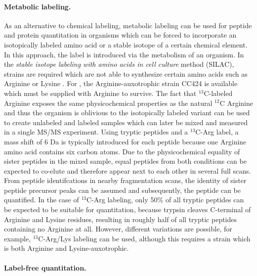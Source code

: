 \paragraph{Metabolic labeling.}

As an alternative to chemical labeling, metabolic labeling can be used for
peptide and protein quantitation in organisms which can be forced to incorporate
an isotopically labeled amino acid or a stable isotope of a certain chemical 
element.
In this approach, the label is introduced via the metabolism of an organism.
In the {\em stable isotope labeling with amino acids in cell culture} method
(SILAC), strains are required which are not able to synthesize certain amino
acids such as Arginine or Lysine \citep{Ong2002}.
For \cre, the Arginine-auxotrophic strain CC424 is available which
must be supplied with Arginine to survive.
The fact that $^{13}$C-labeled Arginine exposes the same physicochemical 
properties as the natural $^{12}$C Arginine and thus the organism is 
oblivious to the isotopically labeled variant can be used to create 
unlabeled and labeled samples which can later be mixed and measured in a 
single MS/MS experiment.
Using tryptic peptides and a $^{13}$C-Arg label, a mass shift of 6 Da is 
typically introduced for each peptide because one Arginine amino acid 
contains six carbon atoms.
Due to the physicochemical equality of sister peptides in the mixed sample,
equal peptides from both conditions can be expected to co-elute and therefore
appear next to each other in several full scans. 
From peptide identifcations in nearby fragmentation scans, the identity of
sister peptide precursor peaks can be assumed and subsequently, the peptide
can be quantified.
In the case of $^{13}$C-Arg labeling, only 50\% of all tryptic peptides can
be expected to be suitable for quantitation, because trypsin cleaves C-terminal
of Arginine and Lysine residues, resulting in roughly half of all tryptic 
peptides containing no Arginine at all.
However, different variations are possible, for example, $^{13}$C-Arg/Lys 
labeling can be used, although this requires a strain which is both Arginine
and Lysine-auxotrophic.

\paragraph{Label-free quantitation.}

